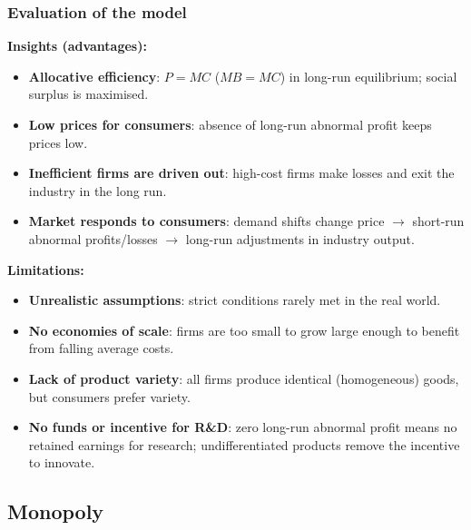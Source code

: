 \documentclass[a4paper,12pt]{article}
\begin{document}
\subsubsection*{Evaluation of the model}
\textbf{Insights (advantages):}
\begin{itemize}
  \item \textbf{Allocative efficiency}: $P = MC$ ($MB = MC$) in long-run equilibrium; social surplus is maximised.
  \item \textbf{Low prices for consumers}: absence of long-run abnormal profit keeps prices low.
  \item \textbf{Inefficient firms are driven out}: high-cost firms make losses and exit the industry in the long run.
  \item \textbf{Market responds to consumers}: demand shifts change price $\to$ short-run abnormal profits/losses $\to$ long-run adjustments in industry output.
\end{itemize}
\textbf{Limitations:}
\begin{itemize}
  \item \textbf{Unrealistic assumptions}: strict conditions rarely met in the real world.
  \item \textbf{No economies of scale}: firms are too small to grow large enough to benefit from falling average costs.
  \item \textbf{Lack of product variety}: all firms produce identical (homogeneous) goods, but consumers prefer variety.
  \item \textbf{No funds or incentive for R\&D}: zero long-run abnormal profit means no retained earnings for research; undifferentiated products remove the incentive to innovate.
\end{itemize}
\subsection{Monopoly}
\end{document}
